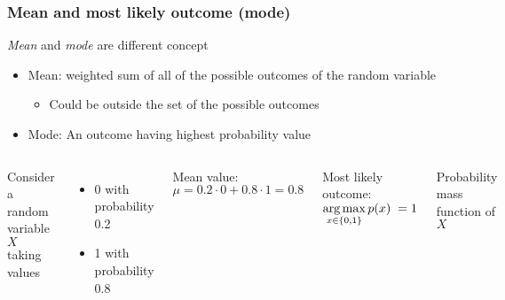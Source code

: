 \begin{frame}
	\frametitle{Mean and most likely outcome (mode)}
	\emph{Mean} and \emph{mode} are different concept
	\begin{itemize}
		\item Mean: weighted sum of all of the possible outcomes of the random variable
		\begin{itemize}
			\item Could be outside the set of the possible outcomes
		\end{itemize}
		\item Mode: An outcome having highest probability value
	\end{itemize}
	
	\begin{columns}
		Consider a random variable $X$ taking values
		\begin{itemize}
			\item 0 with probability 0.2 
			\item 1 with probability 0.8
		\end{itemize}
		\vspace*{1em}
	
	    Mean value: $\mu=0.2\cdot 0 + 0.8 \cdot 1=0.8$\vspace{0.5em}
	    
		Most likely outcome: $\displaystyle \operatorname*{arg\,max}_{x\in\{0,1\}} p(x) \;=1$
		
		\begin{block}{Probability mass function of $X$}
			\centering
		\end{block}
	\end{columns}
	
	
	
\end{frame}
